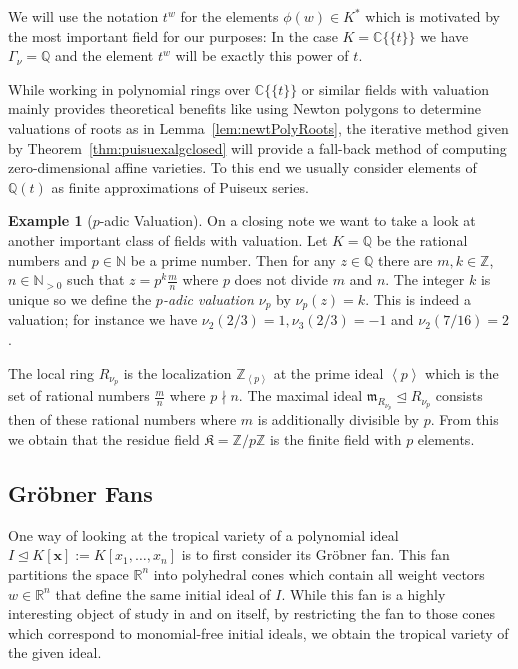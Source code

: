 \documentclass[
  paper=a4,
  titlepage,
  bibliography=totoc,
  listof=totoc,
  pagesize=pdftex
]{scrartcl}
\numberwithin{figure}{section}
\numberwithin{equation}{section}
\numberwithin{table}{section}
\newcommand*\setZ{\mathds{Z}}
\newcommand*\setR{\mathds{R}}
\newcommand*\setC{\mathds{C}}
\newcommand*\setQ{\mathds{Q}}
\newcommand*\setN{\mathds{N}}
\newcommand*\ideal[1]{\left\langle #1 \right\rangle}
\newcommand*\puiseux[2]{#1\{\!\{#2\}\!\}}
\newcommand*\CCt{\puiseux{\setC}{t}}
\let\vec\mathbf
\let\idealof\trianglelefteq
\theoremstyle{definition}
\newtheorem{example}[definition]{Example}
\numberwithin{definition}{section}
\begin{document}
We will use the notation $t^w$ for the elements $\phi(w) \in K^*$ which is motivated by
the most important field for our purposes: In the case $K = \CCt$ we have $\Gamma_\nu =
\setQ$ and the element $t^w$ will be exactly this power of $t$.

While working in polynomial rings over $\CCt$ or similar fields with valuation mainly
provides theoretical benefits like using Newton polygons to determine valuations of roots
as in Lemma~\ref{lem:newtPolyRoots}, the iterative method given by
Theorem~\ref{thm:puisuexalgclosed} will provide a fall-back method of computing
zero-dimensional affine varieties. To this end we usually consider elements of $\setQ(t)$
as finite approximations of Puiseux series.

\begin{example}[$p$-adic Valuation] \label{ex:pAdic}
  On a closing note we want to take a look at another important class of fields with
  valuation. Let $K = \setQ$ be the rational numbers and $p\in \setN$ be a prime number.
  Then for any $z \in \setQ$ there are $m, k \in \setZ$, $n \in \setN_{>0}$ such that $z =
  p^k \frac mn$ where $p$ does not divide $m$ and $n$. The integer $k$ is unique so we
  define the \emph{$p$-adic valuation $\nu_p$} by $\nu_p(z) = k$. This is indeed a
  valuation; for instance we have $\nu_2(2/3) = 1, \nu_3(2/3)=-1$ and $\nu_2(7/16)=2$.

  The local ring $R_{\nu_p}$ is the localization $\setZ_{\ideal p}$ at the prime ideal
  $\ideal p$ which is the set of rational numbers $\frac mn$ where $p \nmid n$. The
  maximal ideal $\mathfrak m_{R_{\nu_p}} \idealof R_{\nu_p}$ consists then of these
  rational numbers where $m$ is additionally divisible by $p$. From this we obtain that
  the residue field $\mathfrak K = \setZ/p\setZ$ is the finite field with $p$ elements.
\end{example}

\subsection{Gröbner Fans}
\label{sec:grobFan}

One way of looking at the tropical variety of a polynomial ideal $I \idealof K[\vec x] :=
K[x_1, \dots, x_n]$ is to first consider its Gröbner fan. This fan partitions the space
$\setR^n$ into polyhedral cones which contain all weight vectors $w\in \setR^n$ that
define the same initial ideal of $I$. While this fan is a highly interesting object of
study in and on itself, by restricting the fan to those cones which correspond to
monomial-free initial ideals, we obtain the tropical variety of the given ideal.
\end{document}
